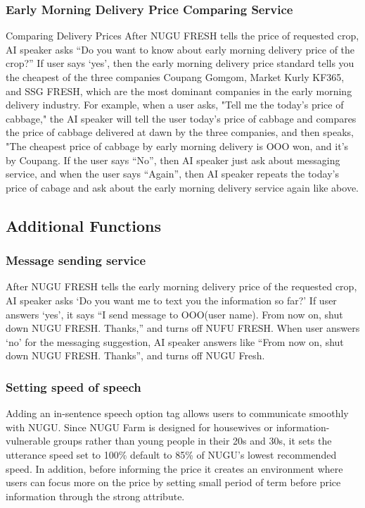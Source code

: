 \documentclass[conference]{IEEEtran}
\begin{document}
\subsubsection{Early Morning Delivery Price Comparing Service}
\begin{paragraph}{Comparing Delivery Prices}
After NUGU FRESH tells the price of requested crop, AI speaker asks “Do you want to know about early morning delivery price of the crop?” If user says ‘yes’, then the early morning delivery price standard tells you the cheapest of the three companies Coupang Gomgom, Market Kurly KF365, and SSG FRESH, which are the most dominant companies in the early morning delivery industry. For example, when a user asks, "Tell me the today’s price of cabbage," the AI speaker will tell the user today’s price of cabbage and compares the price of cabbage delivered at dawn by the three companies, and then speaks, "The cheapest price of cabbage by early morning delivery is OOO won, and it’s by Coupang. If the user says “No”, then AI speaker just ask about messaging service, and when the user says “Again”, then AI speaker repeats the today’s price of cabage and ask about the early morning delivery service again like above.
\end{paragraph}
\newline
\subsection{Additional Functions}
\subsubsection{Message sending service}
After NUGU FRESH tells the early morning delivery price of the requested crop, AI speaker asks ‘Do you want me to text you the information so far?’ If user answers ‘yes’, it says “I send message to OOO(user name). From now on, shut down NUGU FRESH. Thanks,” and turns off NUFU FRESH. When user answers ‘no’ for the messaging suggestion, AI speaker answers like “From now on, shut down NUGU FRESH. Thanks”, and turns off NUGU Fresh.
\subsubsection{Setting speed of speech}
Adding an in-sentence speech option tag allows users to communicate smoothly with NUGU. Since NUGU Farm is designed for housewives or information-vulnerable groups rather than young people in their 20s and 30s, it sets the utterance speed set to 100\% default to 85\% of NUGU's lowest recommended speed. In addition, before informing the price it creates an environment where users can focus more on the price by setting small period of term before price information through the strong attribute.
\end{document}
